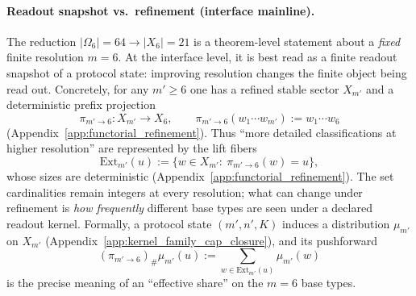 \paragraph{Readout snapshot vs.\ refinement (interface mainline).}
\InterfaceTag The reduction $|\Omega_6|=64\to |X_6|=21$ is a theorem-level statement about a \emph{fixed} finite resolution $m=6$.
At the interface level, it is best read as a finite readout snapshot of a protocol state: improving resolution changes the finite object being read out.
Concretely, for any $m'\ge 6$ one has a refined stable sector $X_{m'}$ and a deterministic prefix projection
\[
\pi_{m'\to 6}:X_{m'}\to X_6,\qquad \pi_{m'\to 6}(w_1\cdots w_{m'}):=w_1\cdots w_6
\]
(Appendix~\ref{app:functorial_refinement}).
Thus ``more detailed classifications at higher resolution'' are represented by the lift fibers
\[
\mathrm{Ext}_{m'}(u):=\{w\in X_{m'}:\ \pi_{m'\to 6}(w)=u\},
\]
whose sizes are deterministic (Appendix~\ref{app:functorial_refinement}).
The set cardinalities remain integers at every resolution; what can change under refinement is \emph{how frequently} different base types are seen under a declared readout kernel.
Formally, a protocol state $(m',n',K)$ induces a distribution $\mu_{m'}$ on $X_{m'}$ (Appendix~\ref{app:kernel_family_cap_closure}), and its pushforward
\[
(\pi_{m'\to 6})_\#\mu_{m'}(u):=\sum_{w\in \mathrm{Ext}_{m'}(u)}\mu_{m'}(w)
\]
is the precise meaning of an ``effective share'' on the $m=6$ base types.

